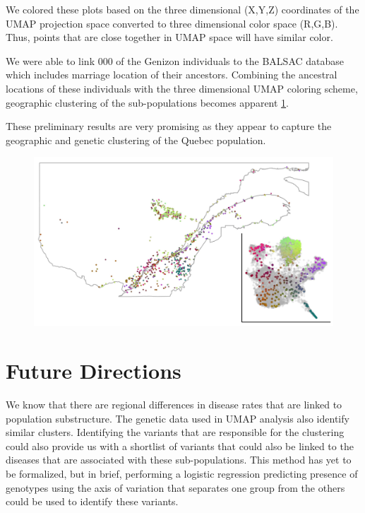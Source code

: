 \documentclass[
11pt, %
oneside, %
english, %
doublespacing, %
headsepline, %
]{MastersDoctoralThesis} %
\begin{document}
We colored these plots based on the three dimensional (X,Y,Z) coordinates of the UMAP projection space converted to three dimensional color space (R,G,B).
Thus, points that are close together in UMAP space will have similar color.

We were able to link 000 of the Genizon individuals to the BALSAC database which includes marriage location of their ancestors.
Combining the ancestral locations of these individuals with the three dimensional UMAP coloring scheme, geographic clustering of the sub-populations becomes apparent \ref{UMAP}.  

These preliminary results are very promising as they appear to capture the geographic and genetic clustering of the Quebec population.


\begin{figure}
\includegraphics[width=\hsize,keepaspectratio]{./Figures/Genizon_BalSac_mapsInMaps4.jpg}
\label{UMAP}
\end{figure}


\section{Future Directions}
We know that there are regional differences in disease rates that are linked to population substructure.
The genetic data used in UMAP analysis also identify similar clusters.
Identifying the variants that are responsible for the clustering could also provide us with a shortlist of variants that could also be linked to the diseases that are associated with these sub-populations.
This method has yet to be formalized, but in brief, performing a logistic regression predicting presence of genotypes using the axis of variation that separates one group from the others could be used to identify these variants.
\end{document}
